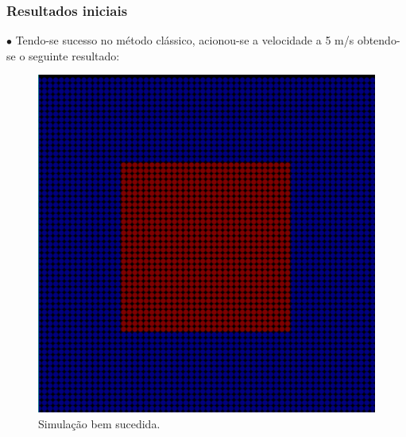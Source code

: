 \documentclass[xcolor=dvipsnames,10pt,aspectratio=169]{beamer}
\begin{document}
	\begin{frame}
	\frametitle{Resultados iniciais}
	
	$\bullet$ Tendo-se sucesso no método clássico, acionou-se a velocidade a 5 m/s obtendo-se o seguinte resultado:
	
	
	\begin{minipage}[h!]{0.30\textwidth}
		\begin{figure}[h!]
			\centering
			\includegraphics[trim = {1cm 1cm 1cm 1cm}, clip , angle=0, scale=0.3]{sucesso_!}
			\caption{Simulação bem sucedida.}
		\end{figure}
	\end{minipage}
	\begin{minipage}[h!]{0.30\textwidth}
		\begin{figure}[h!]
			\centering

\end{figure}
\end{minipage}
\end{frame}
\end{document}
